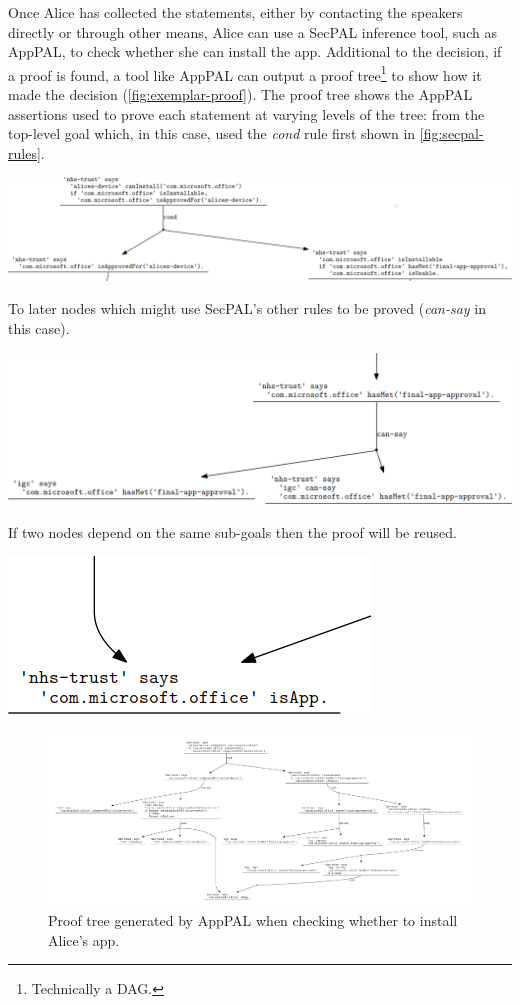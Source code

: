 \documentclass[thesis.tex]{subfiles}
\begin{document}
Once Alice has collected the statements, either by contacting the speakers
directly or through other means, Alice can use a SecPAL inference tool, such as
AppPAL, to check whether she can install the app. Additional to the decision, if
a proof is found, a tool like AppPAL can output a proof
tree\footnote{Technically a DAG.} to show how it made the decision
(\autoref{fig:exemplar-proof}). The proof tree shows the AppPAL assertions used
to prove each statement at varying levels of the tree: from the top-level
goal which, in this case, used the \emph{cond} rule first shown in \autoref{fig:secpal-rules}.

\begin{center}
  \includegraphics[width=0.9\linewidth]{figures/exemplar-proof-1.png}
\end{center}

To later nodes which might use SecPAL's other rules to be proved (\emph{can-say} in this case).

\begin{center}
  \includegraphics[width=0.9\linewidth]{figures/exemplar-proof-2.png}
\end{center}

If two nodes depend on the same sub-goals then the proof will be reused.

\begin{center}
  \includegraphics[width=0.3\linewidth]{figures/exemplar-proof-3.png}
\end{center}

\begin{figure}
  \centering
  \includegraphics[width=0.9\textheight, angle=90]{figures/exemplar-proof.pdf}
  \caption[Proof tree output by AppPAL]{Proof tree generated by AppPAL when checking whether to install Alice's app.}
  \label{fig:exemplar-proof}
\end{figure}
\end{document}
